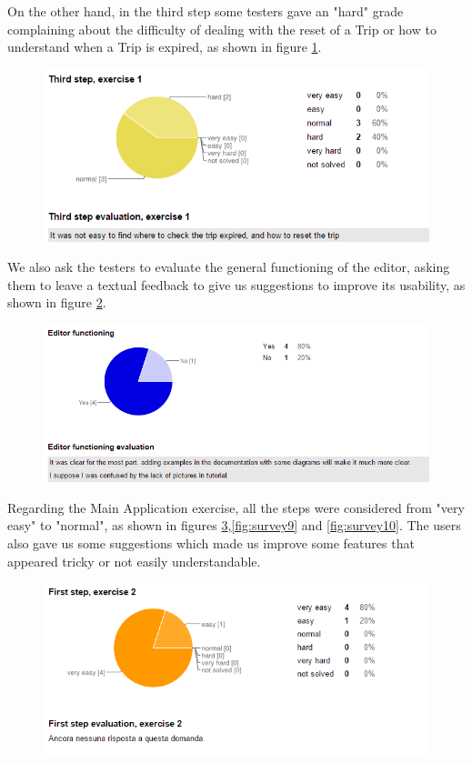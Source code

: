 On the other hand, in the third step some testers gave an "hard" grade complaining about the difficulty of dealing with the reset of a Trip or how to understand when a Trip is expired, as shown in figure \ref{fig:survey4}.

 \begin{figure}[h!]
   \centering
   \includegraphics[width=\linewidth]{pictures/survey4.png}
   \label{fig:survey4}
 \end{figure}

We also ask the testers to evaluate the general functioning of the editor, asking them to leave a textual feedback to give us suggestions to improve its usability, as shown in figure \ref{fig:survey1}.

 \begin{figure}[h!]
   \centering
   \includegraphics[width=\linewidth]{pictures/survey1.png}
   \label{fig:survey1}
 \end{figure}

Regarding the Main Application exercise, all the steps were considered from "very easy" to "normal", as shown in figures \ref{fig:survey8},\ref{fig:survey9} and \ref{fig:survey10}.
The users also gave us some suggestions which made us improve some features that appeared tricky or not easily understandable.
\\

\begin{figure}[h!]
   \centering
   \includegraphics[width=\linewidth]{pictures/survey8.png}
   \label{fig:survey8}
 \end{figure}
 

